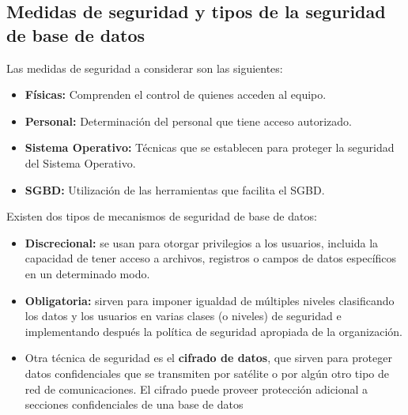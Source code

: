 \documentclass[%
 reprint,
 amsmath,amssymb,
 aps,
]{revtex4-1}
\begin{document}
\subsection{Medidas de seguridad y tipos de la seguridad de base de datos}
Las medidas de seguridad a considerar son las siguientes: 
\begin{itemize}
	\item \textbf{Físicas: }Comprenden el control de quienes acceden al equipo. 
	\item \textbf{Personal: }Determinación del personal que tiene acceso autorizado. 
	\item \textbf{Sistema Operativo: }Técnicas que se establecen para proteger la seguridad del Sistema Operativo. 
	\item \textbf{SGBD: }Utilización de las herramientas que facilita el SGBD. 
\end{itemize}
Existen dos tipos de mecanismos de seguridad de base de datos:
\begin{itemize}
	\item \textbf{Discrecional: }se usan para otorgar privilegios a los usuarios, incluida la capacidad de tener acceso a archivos, registros o campos de datos específicos en un determinado modo.
	\item \textbf{Obligatoria: }sirven para imponer igualdad de múltiples niveles clasificando los datos y los usuarios en varias clases (o niveles) de seguridad e implementando después la política de seguridad apropiada de la organización.
	\item Otra técnica de seguridad es el  \textbf{cifrado de datos}, que sirven para proteger datos confidenciales que se transmiten por satélite o por algún otro tipo de red de comunicaciones. El cifrado puede proveer protección adicional a secciones confidenciales de una base de datos \cite{l}
\end{itemize}
\end{document}
